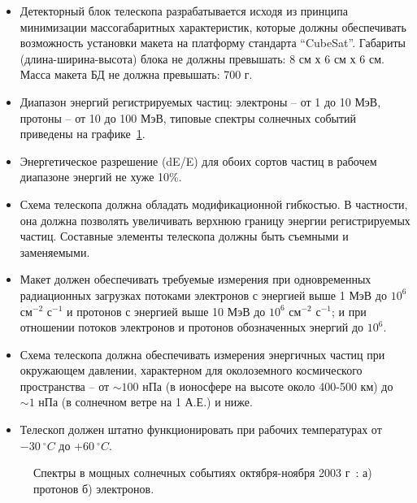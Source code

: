 \begin{itemize}
    \item Детекторный блок телескопа разрабатывается исходя из принципа минимизации массогабаритных характеристик, которые должны обеспечивать возможность установки макета на платформу стандарта “CubeSat”. Габариты (длина-ширина-высота) блока не должны превышать: 8 см х 6 см х 6 см. Масса макета БД не должна превышать: 700 г.
    \item Диапазон энергий регистрируемых частиц: электроны – от 1 до 10 МэВ, протоны – от 10 до 100 МэВ, типовые спектры солнечных событий приведены на графике~\ref{sat:spectrum}.
    \item Энергетическое разрешение (dE/E) для обоих сортов частиц в рабочем диапазоне энергий не хуже 10\%.
    \item Схема телескопа должна обладать модификационной гибкостью. В частности, она должна позволять увеличивать верхнюю границу энергии регистрируемых частиц. Составные элементы телескопа должны быть съемными и заменяемыми.
    \item Макет должен обеспечивать требуемые измерения при одновременных радиационных загрузках потоками электронов с энергией выше 1 МэВ до $10^6$ см$^{-2}$ с$^{-1}$ и протонов с энергией выше 10 МэВ до $10^6$ см$^{-2}$ с$^{-1}$; и при отношении потоков электронов и протонов обозначенных энергий до $10^6$.
    \item Схема телескопа должна обеспечивать измерения энергичных частиц при окружающем давлении, характерном для околоземного космического пространства – от $\sim 100$ нПа (в ионосфере на высоте около 400-500 км) до $\sim 1$ нПа (в солнечном ветре на 1 А.Е.) и ниже. 
    \item Телескоп должен штатно функционировать при рабочих температурах от $-30~^{\circ}C$ до $+60~^{\circ}C$.
    
\end{itemize}

\begin{figure}[t]
    \begin{center}
        \begin{minipage}[h]{0.49\linewidth}
        \end{minipage}
        \hfill
        \begin{minipage}[h]{0.49\linewidth}
        \end{minipage}
        \caption{ Спектры в мощных солнечных событиях октября-ноября 2003 г~\cite{mewaldt2005proton}: а) протонов б) электронов.}
    \end{center}
    \label{sat:spectrum}
\end{figure}

